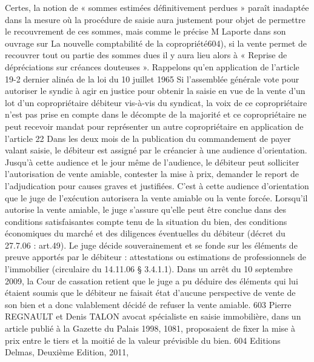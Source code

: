 Certes, la notion de « sommes estimées définitivement perdues » paraît inadaptée dans la mesure où la procédure de saisie aura justement pour objet de permettre le recouvrement de ces sommes, mais comme le précise M Laporte dans son ouvrage sur La nouvelle comptabilité de la copropriété604), si la vente permet de recouvrer tout ou partie des sommes dues il y aura lieu alors à « Reprise de dépréciations sur créances douteuses ».
Rappelons qu’en application de l’article 19-2 dernier alinéa de la loi du 10 juillet 1965
Si l'assemblée générale vote pour autoriser le syndic à agir en justice pour obtenir la saisie en vue de la vente d'un lot d'un copropriétaire débiteur vis-à-vis du syndicat, la voix de ce copropriétaire n'est pas prise en compte dans le décompte de la majorité et ce copropriétaire ne peut recevoir mandat pour représenter un autre copropriétaire en application de l'article 22
Dans les deux mois de la publication du commandement de payer valant saisie, le débiteur est assigné par le créancier à une audience d’orientation. Jusqu’à cette audience et le jour même de l’audience, le débiteur peut solliciter l’autorisation de vente amiable, contester la mise à prix, demander le report de l’adjudication pour causes graves et justifiées.
C’est à cette audience d’orientation que le juge de l’exécution autorisera la vente amiable ou la vente forcée. Lorsqu'il autorise la vente amiable, le juge s'assure qu'elle peut être conclue dans des conditions satisfaisantes compte tenu de la situation du bien, des conditions économiques du marché et des diligences éventuelles du débiteur (décret du 27.7.06 : art.49).
Le juge décide souverainement et se fonde sur les éléments de preuve apportés par le débiteur : attestations ou estimations de professionnels de l’immobilier (circulaire du 14.11.06 § 3.4.1.1).
Dans un arrêt du 10 septembre 2009, la Cour de cassation retient que le juge a pu déduire des éléments qui lui étaient soumis que le débiteur ne faisait état d’aucune perspective de vente de son bien et a donc valablement décidé de refuser la vente amiable.
603 Pierre REGNAULT et Denis TALON avocat spécialiste en saisie immobilière, dans un article publié à la Gazette du Palais 1998, 1081, proposaient de fixer la mise à prix entre le tiers et la moitié de la valeur prévisible du bien.
604 Editions Delmas, Deuxième Edition, 2011, 